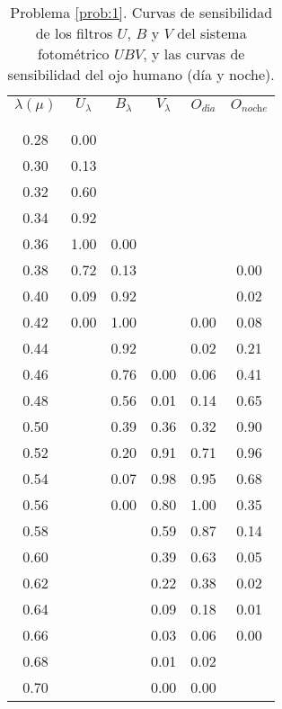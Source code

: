 \documentclass[12pt,spanish,a4paper]{practice}
\begin{document}
\begin{enumerate}[wide, labelwidth=!, labelindent=0pt, label=\textbf{\textrm{\arabic*)}}, ref=\arabic*]
      \begin{table}[h!]
        \centering
        \begin{tabular}{ c | c | c | c | c | c }
          $\lambda(\mu)$  & $U_\lambda$  & $B_\lambda$  & $V_\lambda$  & $O_{\textit{d\'ia}}$  & $O_{\textit{noche}}$ \\
            &  &  &  &  &  \\[-0.8em]\hline
            &  &  &  &  &  \\[-0.8em]
          0.28  & 0.00  &  &  &  &  \\
          0.30  & 0.13  &  &  &  &  \\
          0.32  & 0.60  &  &  &  &  \\
          0.34  & 0.92  &  &  &  &  \\
          0.36  & 1.00  & 0.00  &  &  &  \\
          0.38  & 0.72  & 0.13  &  &  & 0.00 \\
          0.40  & 0.09  & 0.92  &  &  & 0.02 \\
          0.42  & 0.00  & 1.00  &  & 0.00  & 0.08 \\
          0.44  &  & 0.92  &  & 0.02  & 0.21 \\
          0.46  &  & 0.76  & 0.00  & 0.06  & 0.41 \\
          0.48  &  & 0.56  & 0.01  & 0.14  & 0.65 \\
          0.50  &  & 0.39  & 0.36  & 0.32  & 0.90 \\
          0.52  &  & 0.20  & 0.91  & 0.71  & 0.96 \\
          0.54  &  & 0.07  & 0.98  & 0.95  & 0.68 \\
          0.56  &  & 0.00  & 0.80  & 1.00  & 0.35 \\
          0.58  &  &  & 0.59  & 0.87  & 0.14 \\
          0.60  &  &  & 0.39  & 0.63  & 0.05 \\
          0.62  &  &  & 0.22  & 0.38  & 0.02 \\
          0.64  &  &  & 0.09  & 0.18  & 0.01 \\
          0.66  &  &  & 0.03  & 0.06  & 0.00 \\
          0.68  &  &  & 0.01  & 0.02  &  \\
          0.70  &  &  & 0.00  & 0.00  &  \\
          \hline
        \end{tabular}
        \caption{
          Problema \ref{prob:1}. Curvas de sensibilidad de los filtros $U$, $B$ y $V$ del sistema fotométrico $UBV$, y las curvas de sensibilidad del ojo humano (día y noche).
        }\label{table:1}
      \end{table}


\end{enumerate}
\end{document}
